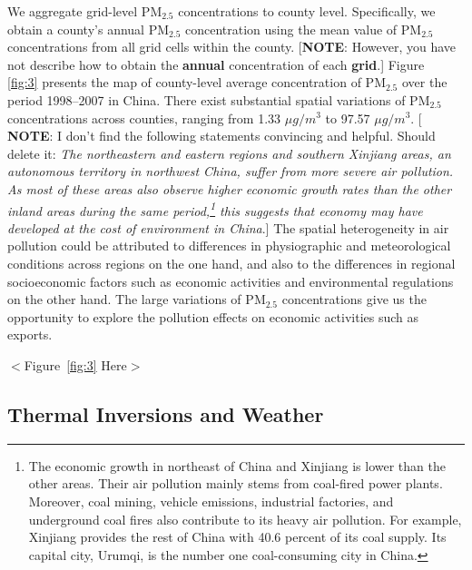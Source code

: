 \documentclass[12pt]{article}
\begin{document}
We aggregate grid-level $\mathrm{PM_{2.5}}$ concentrations to county level.
Specifically, we obtain a county's annual $\mathrm{PM_{2.5}}$ concentration
using the mean value of $\mathrm{PM_{2.5}}$ concentrations from all grid
cells within the county. [\textbf{NOTE}: However, you have not describe how
to obtain the \textbf{annual} concentration of each \textbf{grid}.] Figure~%
\ref{fig:3} presents the map of county-level average concentration of $%
\mathrm{PM_{2.5}}$ over the period 1998--2007 in China. There exist
substantial spatial variations of $\mathrm{PM_{2.5}}$ concentrations across
counties, ranging from 1.33 $\mu g/m^{3}$ to 97.57 $\mu g/m^{3}$. [\textbf{%
NOTE}: I don't find the following statements convincing and helpful. Should
delete it: \emph{The northeastern and eastern regions and southern Xinjiang
areas, an autonomous territory in northwest China, suffer from more severe
air pollution. As most of these areas also observe higher economic growth
rates than the other inland areas during the same period,\footnote{%
The economic growth in northeast of China and Xinjiang is lower than the
other areas. Their air pollution mainly stems from coal-fired power plants.
Moreover, coal mining, vehicle emissions, industrial factories, and
underground coal fires also contribute to its heavy air pollution. For
example, Xinjiang provides the rest of China with 40.6 percent of its coal
supply. Its capital city, Urumqi, is the number one coal-consuming city in
China.} this suggests that economy may have developed at the cost of
environment in China}.] The spatial heterogeneity in air pollution could be
attributed to differences in physiographic and meteorological conditions
across regions on the one hand, and also to the differences in regional
socioeconomic factors such as economic activities and environmental
regulations on the other hand. The large variations of $\mathrm{PM_{2.5}}$
concentrations give us the opportunity to explore the pollution effects on
economic activities such as exports.

\begin{center}
$<$Figure~\ref{fig:3} Here$>$
\end{center}

\subsection{Thermal Inversions and Weather}
\end{document}
